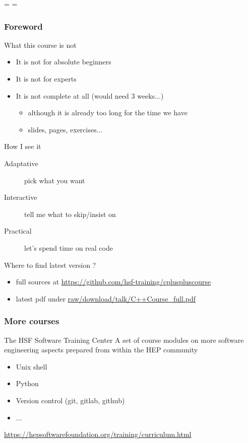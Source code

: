 \documentclass[compress]{beamer}
\begin{document}
\showboxdepth=\maxdimen
\showboxbreadth=\maxdimen

\begin{frame}
  \titlepage
\end{frame}

\begin{frame}
  \frametitle{Foreword}
  \begin{block}{What this course is not}
    \begin{itemize}
    \item It is not for absolute beginners
    \item It is not for experts
    \item It is not complete at all (would need 3 weeks...)
      \begin{itemize}
      \item although it is already too long for the time we have
      \item \inserttotalframenumber{} slides, \insertpresentationendpage{} pages,  exercises...
      \end{itemize}
    \end{itemize}
  \end{block}
  \begin{block}{How I see it}
    \begin{description}
    \item[Adaptative] pick what you want
    \item[Interactive] tell me what to skip/insist on
    \item[Practical] let's spend time on real code
    \end{description}
  \end{block}
  \begin{block}{Where to find latest version ?}
    \begin{itemize}
    \item full sources at {\scriptsize \url{https://github.com/hsf-training/cpluspluscourse}}
    \item latest pdf under {\scriptsize \href{https://github.com/hsf-training/cpluspluscourse/raw/download/talk/C++Course\_full.pdf}{raw/download/talk/C++Course\_full.pdf}}
    \end{itemize}
  \end{block}
\end{frame}


\begin{frame}
  \frametitle{More courses}
  \begin{block}{The HSF Software Training Center}
    A set of course modules on more software engineering aspects prepared from within the HEP community
    \begin{itemize}
      \item Unix shell
      \item Python
      \item Version control (git, gitlab, github)
      \item ...
    \end{itemize}
    {\small \url{https://hepsoftwarefoundation.org/training/curriculum.html}}
  \end{block}

\end{frame}
\end{document}

